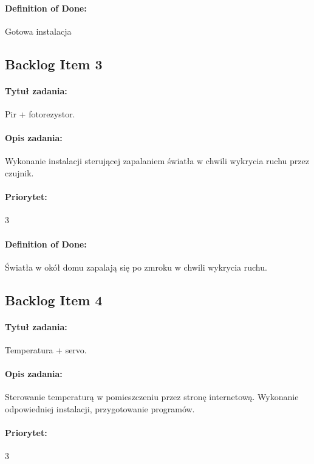 	\paragraph{Definition of Done:}
	Gotowa instalacja


	\subsection{Backlog Item 3}
	\paragraph{Tytuł zadania:}
	Pir + fotorezystor.
	
	\paragraph{Opis zadania:} 
	Wykonanie instalacji sterującej zapalaniem światła w chwili wykrycia ruchu przez czujnik. 
	
	\paragraph{Priorytet:}
	3
	
	\paragraph{Definition of Done:}
	Światła w okół domu zapalają się po zmroku w chwili wykrycia ruchu.
	


	\subsection{Backlog Item 4}
	\paragraph{Tytuł zadania:}
	Temperatura + servo.
	
	\paragraph{Opis zadania:} 
	Sterowanie temperaturą w pomieszczeniu przez stronę internetową. Wykonanie odpowiedniej instalacji, przygotowanie programów.
	
	\paragraph{Priorytet:}
	3
	
